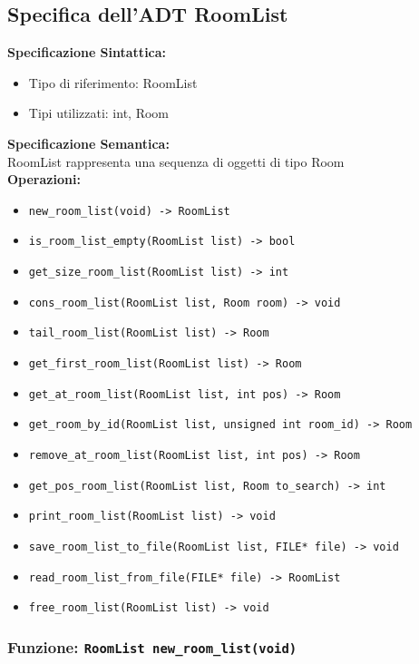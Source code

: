 \documentclass[11pt]{scrartcl} %
\begin{document}
\subsection{Specifica dell'ADT RoomList}

\textbf{Specificazione Sintattica:}
\begin{itemize}
	\item Tipo di riferimento: RoomList
	\item Tipi utilizzati: int, Room
\end{itemize}
\textbf{Specificazione Semantica:} \\
RoomList rappresenta una sequenza di oggetti di tipo Room\\

\textbf{Operazioni:} 
\begin{itemize}
    \item \texttt{new\_room\_list(void) -> RoomList}
    \item \texttt{is\_room\_list\_empty(RoomList list) -> bool}
    \item \texttt{get\_size\_room\_list(RoomList list) -> int}
    \item \texttt{cons\_room\_list(RoomList list, Room room) -> void}
    \item \texttt{tail\_room\_list(RoomList list) -> Room}
    \item \texttt{get\_first\_room\_list(RoomList list) -> Room}
    \item \texttt{get\_at\_room\_list(RoomList list, int pos) -> Room}
    \item \texttt{get\_room\_by\_id(RoomList list, unsigned int room\_id) -> Room}
    \item \texttt{remove\_at\_room\_list(RoomList list, int pos) -> Room}
    \item \texttt{get\_pos\_room\_list(RoomList list, Room to\_search) -> int}
    \item \texttt{print\_room\_list(RoomList list) -> void}
    \item \texttt{save\_room\_list\_to\_file(RoomList list, FILE* file) -> void}
    \item \texttt{read\_room\_list\_from\_file(FILE* file) -> RoomList}
    \item \texttt{free\_room\_list(RoomList list) -> void}
\end{itemize}


\subsubsection{Funzione: \texttt{RoomList new\_room\_list(void)}}
\end{document}
